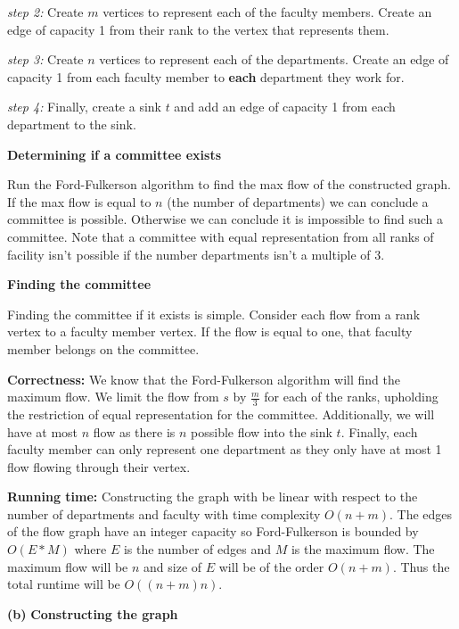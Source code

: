 \documentclass[11pt]{article}
\renewcommand\part[1]{\vspace{.10in}\textbf{(#1)}}
\newcommand\correctness{\vspace{.10in}\textbf{Correctness: }}
\newcommand\runtime{\vspace{.10in}\textbf{Running time: }}
\begin{document}
\textit{step 2:} Create $m$ vertices to represent each of the faculty members. Create an edge of capacity 1 from their rank to the vertex that represents them.

\textit{step 3:} Create $n$ vertices to represent each of the departments. Create an edge of capacity 1 from each faculty member to \textbf{each} department they work for.

\textit{step 4:} Finally, create a sink $t$ and add an edge of capacity 1 from each department to the sink.

\textbf{Determining if a committee exists}

 Run the Ford-Fulkerson algorithm to find the max flow of the constructed graph. If the max flow is equal to $n$ (the number of departments) we can conclude a committee is possible. Otherwise we can conclude it is impossible to find such a committee. Note that a committee with equal representation from all ranks of facility isn't possible if the number departments isn't a multiple of 3.

\textbf{Finding the committee} 

Finding the committee if it exists is simple. Consider each flow from a rank vertex to a faculty member vertex. If the flow is equal to one, that faculty member belongs on the committee.

\correctness We know that the Ford-Fulkerson algorithm will find the maximum flow. We limit the flow from $s$ by $\frac{m}{3}$ for each of the ranks, upholding the restriction of equal representation for the committee. Additionally, we will have at most $n$ flow as there is $n$ possible flow into the sink $t$. Finally, each faculty member can only represent one department as they only have at most 1 flow flowing through their vertex.

\runtime Constructing the graph with be linear with respect to the number of departments and faculty with time complexity $O(n + m)$. The edges of the flow graph have an integer capacity so Ford-Fulkerson is bounded by $O(E * M)$ where $E$ is the number of edges and $M$ is the maximum flow. The maximum flow will be $n$ and size of $E$ will be of the order $O(n + m)$. Thus the total runtime will be $O((n + m)n)$.


\part{b} \textbf{Constructing the graph} 
\end{document}
